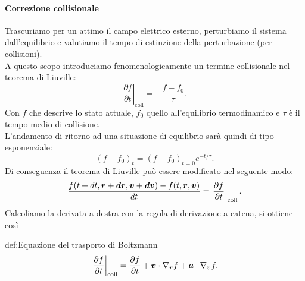 \paragraph{Correzione collisionale}
Trascuriamo per un attimo il campo elettrico esterno, perturbiamo il sistema dall'equilibrio e valutiamo il tempo di estinzione della perturbazione (per collisioni).\\
A questo scopo introduciamo fenomenologicamente un termine collisionale nel teorema di Liuville:
\[
	\left.\frac{\partial f}{\partial t} \right|_{\text{coll}} 
		=
	- \frac{f-f_0}{\tau }
.\] 
Con $f$ che descrive lo stato attuale, $f_0$ quello all'equilibrio termodinamico e $\tau $ è il tempo medio di collisione.\\
L'andamento di ritorno ad una situazione di equilibrio sarà quindi di tipo esponenziale:
\[
	\left( f-f_0 \right)_t = \left( f-f_0 \right)_{t=0} e^{-t /\tau }
.\] 
Di conseguenza il teorema di Liuville può essere modificato nel seguente modo:
\[
	\frac{f( t+dt,\boldsymbol{r}+\boldsymbol{dr}, \boldsymbol{v}+\boldsymbol{dv}) - f( t,\boldsymbol{r},\boldsymbol{v}) }{dt}
	=
	\left.\frac{\partial f}{\partial t} \right|_{\text{coll}}
.\] 
Calcoliamo la derivata a destra con la regola di derivazione a catena, si ottiene così
\begin{defn}{def:Equazione del trasporto di Boltzmann}
	\[
	\left.\frac{\partial f}{\partial t} \right|_{\text{coll}}
		=
	\frac{\partial f}{\partial t} 
	+ \boldsymbol{v}\cdot\nabla_{\boldsymbol{r}} f 
	+ \boldsymbol{a} \cdot \nabla _{\boldsymbol{v}} f  
	.\]
\end{defn}
